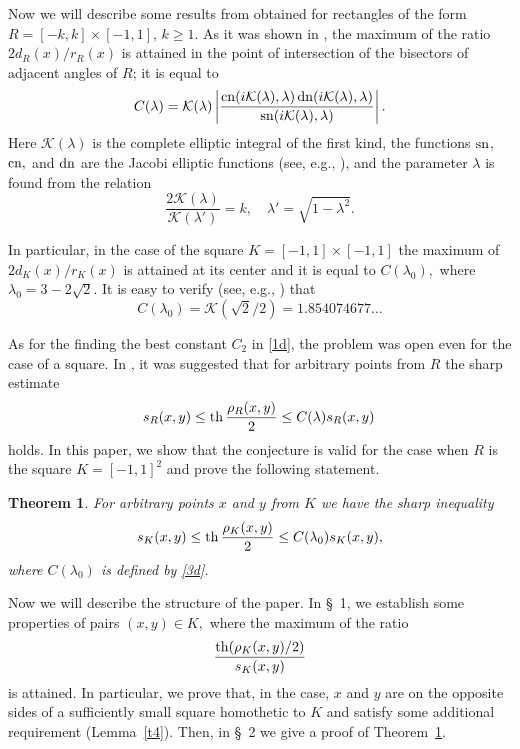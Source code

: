 \documentclass[12pt,a4paper]{amsart}
\newtheorem{theor}{Theorem}
\def\th{\mathop{\rm th}\nolimits}
\def\sn{\mathop{\rm sn}\nolimits}
\def\cn{\mathop{\rm cn}\nolimits}
\def\dn{\mathop{\rm dn}\nolimits}
\begin{document}
Now we will describe some results from \cite{dknv} obtained for rectangles of the form $R=[-k,k] \times[-1,1]$, $k\ge 1$.  As it was shown in \cite[thrm.~4.7]{dknv},
the maximum of the ratio
$
{2d_R(x)}/{r_R(x)}
$
is attained in the point of intersection of the bisectors of adjacent angles of $R$; it is equal to
$$C(\lambda)=
\mathcal{K}(\lambda)\left|\frac{\cn(i\mathcal{K}(\lambda),\lambda)\dn(i\mathcal{K}(\lambda),
\lambda)}{\sn(i\mathcal{K}(\lambda),\lambda)}\right|.
$$
Here $\mathcal{K}(\lambda)$ is the complete elliptic integral of the first kind, the functions  $\sn$, $\cn,$  and $\dn$ are the Jacobi elliptic functions (see, e.g., \cite{akhiezer,avv}), and the parameter $\lambda$ is found from the relation
$$
\frac{2\mathcal{K}(\lambda)}{\mathcal{K}(\lambda')}=k, \quad
\lambda'=\sqrt{1-\lambda^2}.
$$

In particular, in the case of the square $K=[-1,1]\times[-1,1]$ the maximum of
$
{2d_K(x)}/{r_K(x)}
$
is attained at its center and it  is equal to $C(\lambda_0),$ where $\lambda_0=3-2\sqrt{2}$. It is easy to verify (see, e.g., \cite[thrm.~1.2]{b1}) that
\begin{equation}\label{3d}
C(\lambda_0)=\mathcal{K}(\sqrt{2}/2)=1.854074677\ldots
\end{equation}

As for the finding the best constant $C_2$ in \eqref{1d}, the
problem was open even for the case of a square. In
\cite[conj.~4.11]{dknv}, it was suggested that for arbitrary points
from $R$ the sharp estimate
$$
{s_R(x,y)}\le{\th\frac{\rho_R(x,y)}{2}}  \le
C(\lambda){s_R(x,y)}\,$$ holds. In this paper, we show that the
conjecture is valid for the case when $R$ is the square $K=[-1,1]^2$
and prove the following statement.

\begin{theor}\label{square}
For arbitrary points $x$ and $y$ from $K$ we have the sharp inequality
$$
{s_K(x,y)}\le{\th\frac{\rho_K(x,y)}{2}}  \le
C(\lambda_0){s_K(x,y)},$$ where $C(\lambda_0)$ is defined by
\eqref{3d}.
\end{theor}

Now we will describe the structure of the paper.
In \S~1, we establish some properties of pairs $(x,y)\in K,$ where
the maximum of the ratio
$$\frac{\th (\rho_K(x,y)/2)}{s_K(x,y)}$$
is attained.
In particular, we prove that, in the case,
$x$ and $y$ are on the opposite sides of a sufficiently small square
homothetic to $K$ and satisfy some additional requirement
(Lemma~\ref{t4}).  Then, in \S~2 we give a proof of
Theorem~\ref{square}.
\end{document}
